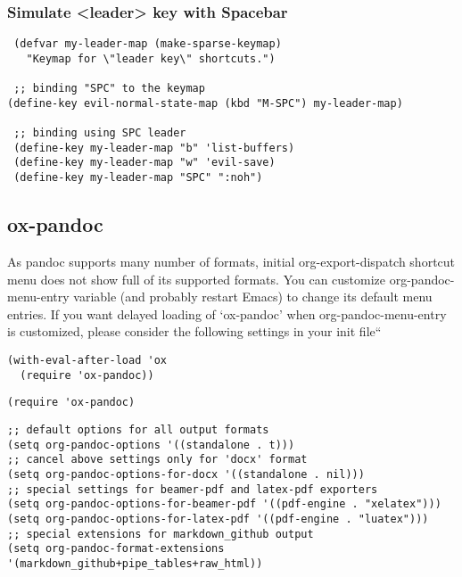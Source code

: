 \documentclass[11pt]{article}
\begin{document}
\subsubsection*{Simulate <leader> key with Spacebar}
\label{sec:org03de016}

\begin{verbatim}
 (defvar my-leader-map (make-sparse-keymap)
   "Keymap for \"leader key\" shortcuts.")

 ;; binding "SPC" to the keymap
(define-key evil-normal-state-map (kbd "M-SPC") my-leader-map)

 ;; binding using SPC leader
 (define-key my-leader-map "b" 'list-buffers)
 (define-key my-leader-map "w" 'evil-save)
 (define-key my-leader-map "SPC" ":noh")
\end{verbatim}



\subsection*{ox-pandoc}
\label{sec:org74fff91}

As pandoc supports many number of formats, initial org-export-dispatch
shortcut menu does not show full of its supported formats. You can customize
org-pandoc-menu-entry variable (and probably restart Emacs) to change its
default menu entries.
If you want delayed loading of `ox-pandoc’ when org-pandoc-menu-entry
is customized, please consider the following settings in your init file``

\begin{verbatim}
(with-eval-after-load 'ox
  (require 'ox-pandoc))
\end{verbatim}

\begin{verbatim}
(require 'ox-pandoc)
\end{verbatim}

\begin{verbatim}
;; default options for all output formats
(setq org-pandoc-options '((standalone . t)))
;; cancel above settings only for 'docx' format
(setq org-pandoc-options-for-docx '((standalone . nil)))
;; special settings for beamer-pdf and latex-pdf exporters
(setq org-pandoc-options-for-beamer-pdf '((pdf-engine . "xelatex")))
(setq org-pandoc-options-for-latex-pdf '((pdf-engine . "luatex")))
;; special extensions for markdown_github output
(setq org-pandoc-format-extensions '(markdown_github+pipe_tables+raw_html))
\end{verbatim}
\end{document}
